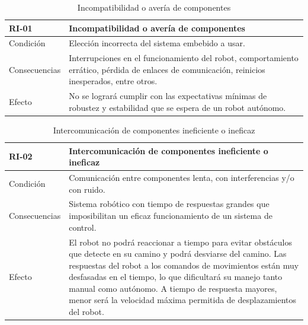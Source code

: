 \begin{table}[H]
\centering
\begin{tabular} {|m{2.5cm}|m{11.5cm}|}
    \hline \rowcolor{test_header_color}
    RI-01 & Incompatibilidad o avería de componentes \\
    \hline
        Condición & Elección incorrecta del sistema embebido a usar. \\
    \hline
        Consecuencias & Interrupciones en el funcionamiento del robot, comportamiento errático, pérdida de enlaces de comunicación, reinicios inesperados, entre otros. \\
    \hline
        Efecto & No se logrará cumplir con las expectativas mínimas de robustez y estabilidad que se espera de un robot autónomo. \\
    \hline
\end{tabular}
\label{}
\caption{Incompatibilidad o avería de componentes}
\end{table}

\begin{table}[H]
\centering
\begin{tabular} {|m{2.5cm}|m{11.5cm}|}
    \hline \rowcolor{test_header_color}
    RI-02 & Intercomunicación de componentes ineficiente o ineficaz \\
    \hline
        Condición & Comunicación entre componentes lenta, con interferencias y/o con ruido. \\
    \hline
        Consecuencias & Sistema robótico con tiempo de respuestas grandes que imposibilitan un eficaz funcionamiento de un sistema de control. \\
    \hline
        Efecto & El robot no podrá reaccionar a tiempo para evitar obstáculos que detecte en su camino y podrá desviarse del camino. Las respuestas del robot a los comandos de movimientos están muy desfasadas en el tiempo, lo que dificultará su manejo tanto manual como autónomo. A tiempo de respuesta mayores, menor será la velocidad máxima permitida de desplazamientos del robot. \\
    \hline
    \end{tabular}
\caption{Intercomunicación de componentes ineficiente o ineficaz}
\end{table}

